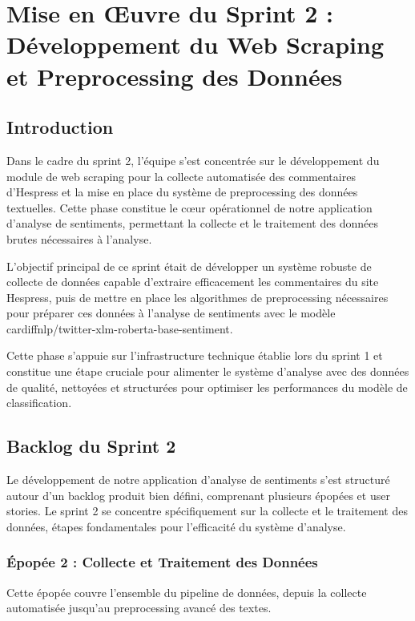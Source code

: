 \chapter{Mise en Œuvre du Sprint 2 : Développement du Web Scraping et Preprocessing des Données}

\section{Introduction}

Dans le cadre du sprint 2, l'équipe s'est concentrée sur le développement du module de web scraping pour la collecte automatisée des commentaires d'Hespress et la mise en place du système de preprocessing des données textuelles. Cette phase constitue le cœur opérationnel de notre application d'analyse de sentiments, permettant la collecte et le traitement des données brutes nécessaires à l'analyse.

L'objectif principal de ce sprint était de développer un système robuste de collecte de données capable d'extraire efficacement les commentaires du site Hespress, puis de mettre en place les algorithmes de preprocessing nécessaires pour préparer ces données à l'analyse de sentiments avec le modèle cardiffnlp/twitter-xlm-roberta-base-sentiment.

Cette phase s'appuie sur l'infrastructure technique établie lors du sprint 1 et constitue une étape cruciale pour alimenter le système d'analyse avec des données de qualité, nettoyées et structurées pour optimiser les performances du modèle de classification.

\section{Backlog du Sprint 2}

Le développement de notre application d'analyse de sentiments s'est structuré autour d'un backlog produit bien défini, comprenant plusieurs épopées et user stories. Le sprint 2 se concentre spécifiquement sur la collecte et le traitement des données, étapes fondamentales pour l'efficacité du système d'analyse.

\subsection{Épopée 2 : Collecte et Traitement des Données}

Cette épopée couvre l'ensemble du pipeline de données, depuis la collecte automatisée jusqu'au preprocessing avancé des textes.

